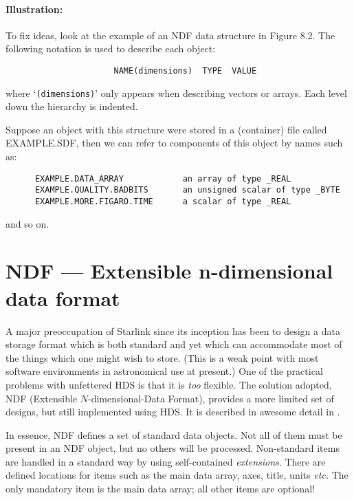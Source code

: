 \paragraph{Illustration:}\hfill

To fix ideas, look at the example of an NDF data structure in Figure 8.2.
The following notation is used to describe each object:

\begin{small}
\begin{verbatim}
                      NAME(dimensions)  TYPE  VALUE
\end{verbatim}
\end{small}

where `\verb+(dimensions)+' only appears when describing vectors or arrays.
Each level down the hierarchy is indented.

Suppose an object with this structure were stored in a (container) file called
EXAMPLE.SDF, then we can refer to components of this object by names such as:

\begin{small}
\begin{verbatim}
      EXAMPLE.DATA_ARRAY            an array of type _REAL
      EXAMPLE.QUALITY.BADBITS       an unsigned scalar of type _BYTE
      EXAMPLE.MORE.FIGARO.TIME      a scalar of type _REAL
\end{verbatim}
\end{small}

and so on.

\section {NDF --- Extensible n-dimensional data format}
\label{S_NDF}

A major preoccupation of Starlink since its inception has been to design a data
storage format which is both standard and yet which can accommodate most of
the things which one might wish to store.
(This is a weak point with most software environments in astronomical use at
present.)
One of the practical problems with unfettered HDS is that it is {\em too\/}
flexible.
The solution adopted, NDF (Extensible $N$-dimensional-Data Format), provides
a more limited set of designs, but still implemented using HDS.
It is described in awesome detail in .

In essence, NDF defines a set of standard data objects.
Not all of them must be present in an NDF object, but no others will be
processed.
Non-standard items are handled in a standard way by using self-contained
{\em extensions}.
There are defined locations for items such as the main data array, axes, title,
units {\em etc.}
The only mandatory item is the main data array; all other items are optional!

